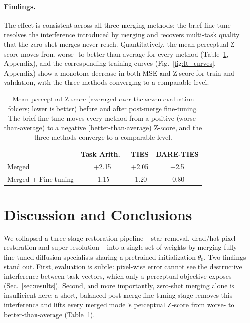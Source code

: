\documentclass{article}
\begin{document}
\paragraph*{Findings.} The effect is consistent across all three merging methods: the brief fine-tune resolves the interference introduced by merging and recovers multi-task quality that the zero-shot merges never reach. Quantitatively, the mean perceptual Z-score moves from worse- to better-than-average for every method (Table~\ref{tab:zscore_ft}, Appendix), and the corresponding training curves (Fig.~\ref{fig:ft_curves}, Appendix) show a monotone decrease in both MSE and Z-score for train and validation, with the three methods converging to a comparable level.

\begin{table}[h]
	\label{tab:zscore_results}
	\begin{center}
		\begin{small}
			\begin{tabular}{lccc}
				\toprule
				                     & Task Arith.\  & TIES  & DARE-TIES \\
				\midrule
				Merged               & +2.15         & +2.05 & +2.5      \\
				Merged + Fine-tuning & -1.15         & -1.20 & -0.80     \\
				\bottomrule
			\end{tabular}
		\end{small}
	\end{center}
	\caption{Mean perceptual Z-score (averaged over the seven evaluation folders; lower is better) before and after post-merge fine-tuning. The brief fine-tune moves every method from a positive (worse-than-average) to a negative (better-than-average) Z-score, and the three methods converge to a comparable level.}
	\label{tab:zscore_ft}
\end{table}

\section{Discussion and Conclusions}
\label{sec:discussion}

We collapsed a three-stage restoration pipeline -- star removal, dead/hot-pixel restoration and super-resolution -- into a single set of weights by merging fully fine-tuned diffusion specialists sharing a pretrained initialization $\theta_0$. Two findings stand out. First, evaluation is subtle: pixel-wise error cannot see the destructive interference between task vectors, which only a perceptual objective exposes (Sec.~\ref{sec:results}). Second, and more importantly, zero-shot merging alone is insufficient here: a short, balanced post-merge fine-tuning stage removes this interference and lifts every merged model's perceptual Z-score from worse- to better-than-average (Table~\ref{tab:zscore_ft}).
\end{document}
